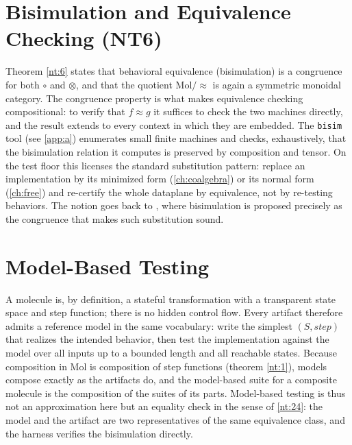 \section{Bisimulation and Equivalence Checking (NT6)}
Theorem \ref{nt:6} states that behavioral equivalence (bisimulation) is a congruence for both $\circ$ and $\otimes$, and that the quotient $\mathrm{Mol}/\!\!\approx$ is again a symmetric monoidal category. The congruence property is what makes equivalence checking compositional: to verify that $f \approx g$ it suffices to check the two machines directly, and the result extends to every context in which they are embedded. The \texttt{bisim} tool (see \autoref{app:a}) enumerates small finite machines and checks, exhaustively, that the bisimulation relation it computes is preserved by composition and tensor. On the test floor this licenses the standard substitution pattern: replace an implementation by its minimized form (\autoref{ch:coalgebra}) or its normal form (\autoref{ch:free}) and re-certify the whole dataplane by equivalence, not by re-testing behaviors. The notion goes back to \cite{park}, where bisimulation is proposed precisely as the congruence that makes such substitution sound.

\section{Model-Based Testing}
A molecule is, by definition, a stateful transformation with a transparent state space and step function; there is no hidden control flow. Every artifact therefore admits a reference model in the same vocabulary: write the simplest $(S,\mathit{step})$ that realizes the intended behavior, then test the implementation against the model over all inputs up to a bounded length and all reachable states. Because composition in Mol is composition of step functions (theorem \ref{nt:1}), models compose exactly as the artifacts do, and the model-based suite for a composite molecule is the composition of the suites of its parts. Model-based testing is thus not an approximation here but an equality check in the sense of \ref{nt:24}: the model and the artifact are two representatives of the same equivalence class, and the harness verifies the bisimulation directly.

